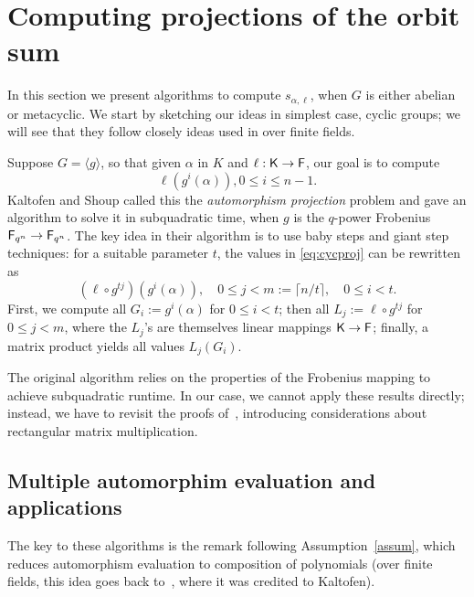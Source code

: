 \section{Computing projections of the orbit sum}\label{sec:osum}

In this section we present algorithms to compute $s_{\alpha,\ell}$,
when $G$ is either abelian or metacyclic. We start by sketching our
ideas in simplest case, cyclic groups; we will see that they follow
closely ideas used in \cite{Kaltofen} over finite fields.

Suppose $G = \langle g \rangle$, so that given $\alpha$ in $K$ and
$\ell: {\mathsf{K}} \to {\mathsf{F}}$, our goal is to compute
\begin{equation}\label{eq:cycproj}
  \ell(g^i(\alpha)), 0 \leq i \leq n-1.
\end{equation}
Kaltofen and Shoup called this the {\em automorphism projection}
problem and gave an algorithm to solve it in subquadratic time, when
$g$ is the $q$-power Frobenius ${\mathsf{F}}_{q^n} \to {\mathsf{F}}_{q^n}$. 
The key idea in their algorithm is to use baby steps and giant step
techniques: for a suitable parameter $t$, the values in \eqref{eq:cycproj} can be rewritten as
$$(\ell \circ g^{tj})(g^i(\alpha)), \quad 0 \leq j < m:=\lceil n/t
\rceil,\quad 0 \leq i <t.$$ First, we compute all $G_i:=g^i(\alpha)$
for $0 \leq i <t$; then all $L_j:=\ell \circ g^{tj}$ for $0 \leq j
<m$, where the $L_j$'s are themselves linear mappings ${\mathsf{K}} \to {\mathsf{F}}$;
finally, a matrix product yields all values $L_j(G_i)$.
 
The original algorithm relies on the properties of the Frobenius
mapping to achieve subquadratic runtime. In our case, we cannot apply
these results directly; instead, we have to revisit the proofs
of~\cite[Lemmata 3, 4 $\&$~ 8]{Kaltofen}, introducing
considerations about rectangular matrix multiplication.


\subsection{Multiple automorphim evaluation and applications}

The key to these algorithms is the remark following
Assumption~\ref{assum}, which reduces automorphism evaluation to
composition of polynomials (over finite fields, this idea goes back
to~\cite{GaSh92}, where it was credited to Kaltofen).

